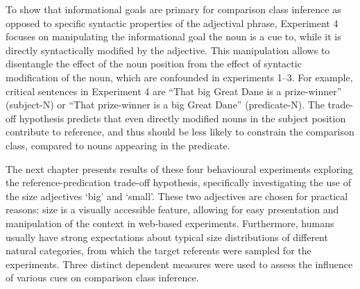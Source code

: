 To show that informational goals are primary for comparison class inference as opposed to specific syntactic properties of the adjectival phrase, Experiment 4 focuses on manipulating the informational goal the noun is a cue to, while it is directly syntactically modified by the adjective. This manipulation allows to disentangle the effect of the noun position from the effect of syntactic modification of the noun, which are confounded in experiments 1--3. For example, critical sentences in Experiment 4 are “That big Great Dane is a prize-winner” (subject-N) or “That prize-winner is a big Great Dane” (predicate-N). The trade-off hypothesis predicts that even directly modified nouns in the subject position contribute to reference, and thus should be less likely to constrain the comparison class, compared to nouns appearing in the predicate.

The next chapter presents results of these four behavioural experiments exploring the reference-predication trade-off hypothesis, specifically investigating the use of the size adjectives ‘big’ and ‘small’. These two adjectives are chosen for practical reasons: size is a visually accessible feature, allowing for easy presentation and manipulation of the context in web-based experiments. Furthermore, humans usually have strong expectations about typical size distributions of different natural categories, from which the target referents were sampled for the experiments. Three distinct dependent measures were used to assess the influence of various cues on comparison class inference. %